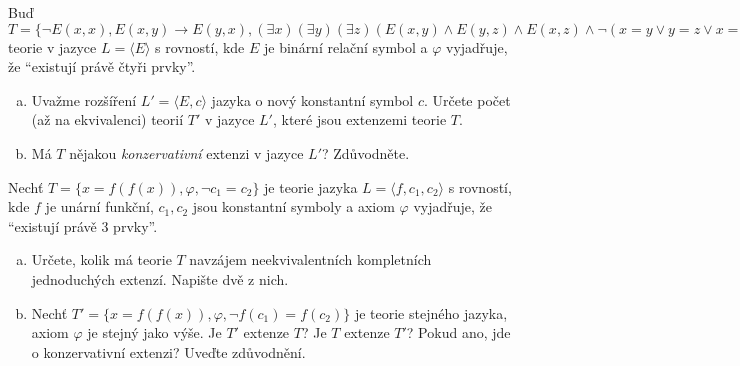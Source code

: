 \begin{problem}

    Buď $T=\{\neg E(x,x), E(x,y)\to E(y,x), (\exists x)(\exists y)(\exists z)(E(x,y)\wedge E(y,z)\wedge E(x,z)\wedge \neg(x=y\vee y=z\vee x=z)),\varphi\}$ teorie v jazyce $L=\langle E\rangle$ s rovností, kde $E$ je binární relační symbol a $\varphi$ vyjadřuje, že ``existují právě čtyři prvky''.
    \begin{enumerate}[(a)]
        \item Uvažme rozšíření $L'=\langle E,c\rangle$ jazyka o nový konstantní symbol $c$. Určete počet (až na ekvivalenci) teorií $T'$ v jazyce $L'$, které jsou extenzemi teorie $T$. 
        \item Má $T$ nějakou \emph{konzervativní} extenzi v jazyce $L'$? Zdůvodněte.
    \end{enumerate}

\end{problem}


\begin{problem}

    Nechť $T=\{x=f(f(x)),\varphi, \neg c_1 = c_2\}$ je teorie jazyka $L=\langle f,c_1,c_2\rangle$ s rovností, kde $f$ je unární funkční, $c_1,c_2$ jsou konstantní symboly a axiom $\varphi$ vyjadřuje, že ``existují právě $3$ prvky''.
    \begin{enumerate}[(a)]    
        \item Určete, kolik má teorie $T$ navzájem neekvivalentních kompletních jednoduchých extenzí. Napište dvě z nich.
        \item Nechť $T'=\{x=f(f(x)),\varphi,\neg f(c_1)=f(c_2)\}$ je teorie stejného jazyka, axiom $\varphi$ je stejný jako výše. Je $T'$ extenze $T$? Je $T$ extenze $T'$? Pokud ano, jde o konzervativní extenzi? Uveďte zdůvodnění.
    \end{enumerate}
    
\end{problem}


